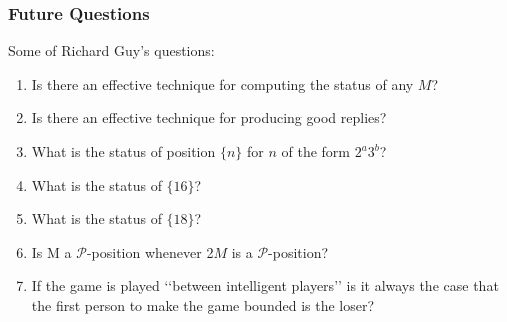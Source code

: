 \documentclass{beamer}
\begin{document}
\begin{frame}
\begin{center}
\frametitle{Future Questions}

Some of Richard Guy\rq{}s questions:

\begin{enumerate}

\item Is there an effective technique for computing the status of any $M$?

\item Is there an effective technique for producing good replies?

\item What is the status of position $\lbrace n \rbrace$ for $n$ of the form $2^a 3^b$?

\item What is the status of $\lbrace 16 \rbrace$?

\item What is the status of $\lbrace 18 \rbrace$?

\item Is M a $\mathscr{P}$-position whenever 2$M$ is a $\mathscr{P}$-position?

\item If the game is played \lq\lq{}between intelligent players\rq\rq{} is it always the case that the first person to make the game bounded is the loser?

\end{enumerate}

\end{center}
\end{frame}

\begin{frame}[noframenumbering]
\titlepage %
\end{frame}


\end{document}
